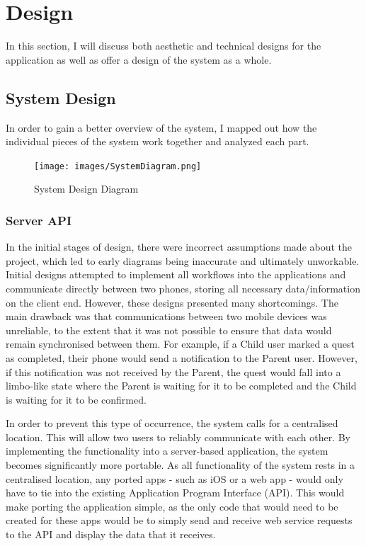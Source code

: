 \chapter{Design}
In this section, I will discuss both aesthetic and technical designs for the application as well as offer a design of the system as a whole.

\section{System Design}
In order to gain a better overview of the system, I mapped out how the individual pieces of the system work together and analyzed each part.

\begin{figure}[ht]
	\centering
	\texttt{[image: images/SystemDiagram.png]}
	\caption{System Design Diagram}
	\label{fig:systemdesign}
\end{figure} 

\subsection{Server API}
In the initial stages of design, there were incorrect assumptions made about the project, which led to early diagrams being inaccurate and ultimately unworkable.
Initial designs attempted to implement all workflows into the applications and communicate directly between two phones, storing all necessary data/information on the client end. 
However, these designs presented many shortcomings. The main drawback was that communications between two mobile devices was unreliable, to the extent that it was not possible to ensure that data would remain synchronised between them.
For example, if a Child user marked a quest as completed, their phone would send a notification to the Parent user.
However, if this notification was not received by the Parent, the quest would fall into a limbo-like state where the Parent is waiting for it to be completed and the Child is waiting for it to be confirmed.

In order to prevent this type of occurrence, the system calls for a centralised location. This will allow two users to reliably communicate with each other.
By implementing the functionality into a server-based application, the system becomes significantly more portable. 
As all functionality of the system rests in a centralised location, any ported apps - such as iOS or a web app - would only have to tie into the existing Application Program Interface (API).
This would make porting the application simple, as the only code that would need to be created for these apps would be to simply send and receive web service requests to the API and display the data that it receives.

